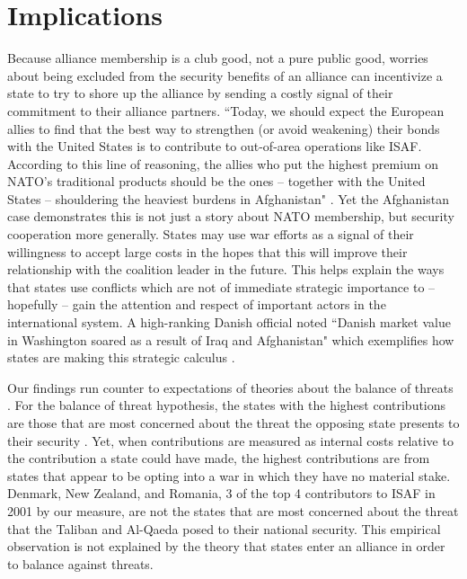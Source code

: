 \documentclass[12pt,letterpaper]{article}
\begin{document}
\section{Implications}
	Because alliance membership is a club good, not a pure public good, worries about being excluded from the security benefits of an alliance can incentivize a state to try to shore up the alliance by sending a costly signal of their commitment to their alliance partners. ``Today, we should expect the European allies to find that the best way to strengthen (or avoid weakening) their bonds with the United States is to contribute to out-of-area operations like ISAF. According to this line of reasoning, the allies who put the highest premium on NATO’s traditional products should be the ones – together with the United States – shouldering the heaviest burdens in Afghanistan" \citep[331]{ringsmose_natoburdensharingredux_2010}. Yet the Afghanistan case demonstrates this is not just a story about NATO membership, but security cooperation more generally. States may use war efforts as a signal of their willingness to accept large costs in the hopes that this will improve their relationship with the coalition leader in the future. This helps explain the ways that states use conflicts which are not of immediate strategic importance to -- hopefully -- gain the attention and respect of important actors in the international system. A high-ranking Danish official noted ``Danish market value in Washington soared as a result of Iraq and Afghanistan" which exemplifies how states are making this strategic calculus \citep{henriksen_whatdiddenmark_2012}.

	Our findings run counter to expectations of theories about the balance of threats \citep{walt_originsalliance_1987}. For the balance of threat hypothesis, the states with the highest contributions are those that are most concerned about the threat the opposing state presents to their security \citep{haesebrouck_democraticparticipationair_2016}. Yet, when contributions are measured as internal costs relative to the contribution a state could have made, the highest contributions are from states that appear to be opting into a war in which they have no material stake. Denmark, New Zealand, and Romania, 3 of the top 4 contributors to ISAF in 2001 by our measure, are not the states that are most concerned about the threat that the Taliban and Al-Qaeda posed to their national security. This empirical observation is not explained by the theory that states enter an alliance in order to balance against threats.
\end{document}
